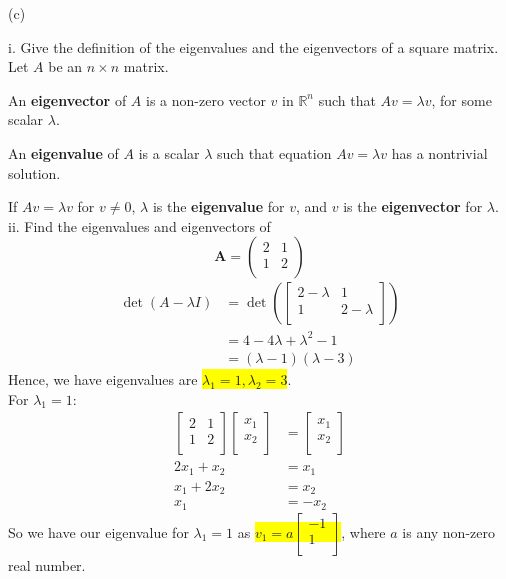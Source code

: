 \documentclass[12pt]{article}
\begin{document}
\noindent (c)

i. Give the definition of the eigenvalues and the eigenvectors of a square matrix.\\

Let $A$ be an $n \times n$ matrix.

An \textbf{eigenvector} of $A$ is a non-zero vector $v$ in $\mathbb{R}^n$ such that $Av = \lambda v$, for some scalar $\lambda$.

An \textbf{eigenvalue} of $A$ is a scalar $\lambda$ such that equation $Av = \lambda v$ has a nontrivial solution.

If $Av = \lambda v$ for $v\neq 0$, $\lambda$ is the \textbf{eigenvalue} for $v$, and $v$ is the \textbf{eigenvector} for $\lambda$.\\

ii. Find the eigenvalues and eigenvectors of
$$\mathbf{A} =    \begin{pmatrix}  2 & 1 \\ 1 & 2 \\ \end{pmatrix}$$
\begin{align*}
\det(A-\lambda I) &= \det(\begin{bmatrix}  2-\lambda & 1 \\ 1 & 2-\lambda \\ \end{bmatrix}) \\
&= 4 - 4\lambda + \lambda^2 -1\\
&= (\lambda - 1 ) (\lambda - 3)
\end{align*}
Hence, we have eigenvalues are \colorbox{yellow}{$\lambda_1 = 1, \lambda_2 = 3$}.\\

For $\lambda_1 = 1$:
\begin{align*}
\begin{bmatrix}  2  & 1 \\ 1 & 2  \\ \end{bmatrix} \begin{bmatrix}  x_1 \\ x_2 \\ \end{bmatrix} &= \begin{bmatrix}  x_1 \\ x_2 \\ \end{bmatrix}\\
2x_1 + x_2 &= x_1\\
x_1 + 2x_2 &= x_2\\
x_1 &= - x_2
\end{align*}
So we have our eigenvalue for $\lambda_1 = 1$ as \colorbox{yellow}{$v_1 = a\begin{bmatrix}  -1 \\ 1 \\ \end{bmatrix}$}, where $a$ is any non-zero real number.\\
\end{document}
